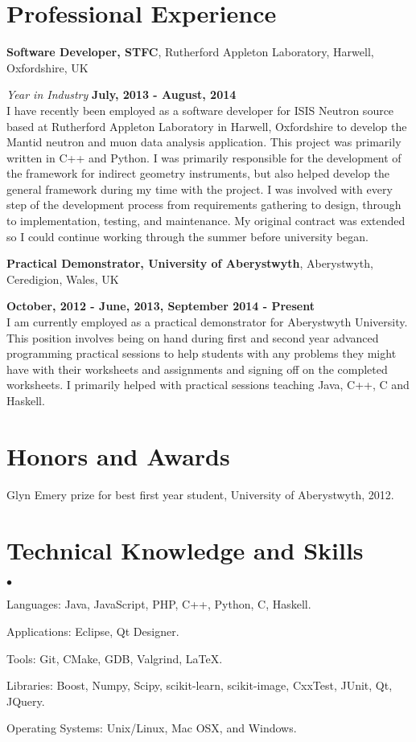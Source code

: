 \documentclass[margin,line]{res}
\newenvironment{list2}{
  \begin{list}{$\bullet$}{%
      \setlength{\itemsep}{0in}
      \setlength{\parsep}{0in} \setlength{\parskip}{0in}
      \setlength{\topsep}{0in} \setlength{\partopsep}{0in}
      \setlength{\leftmargin}{0.2in}}}{\end{list}}
\begin{document}
\begin{resume}
\section{\sc Professional Experience}
{\bf Software Developer, STFC}, Rutherford Appleton Laboratory, Harwell, Oxfordshire, UK

\vspace{-.3cm}
{\em Year in Industry} \hfill {\bf July, 2013 - August, 2014}\\
I have recently been employed as a software developer for ISIS Neutron source based at Rutherford Appleton Laboratory in Harwell, Oxfordshire to develop the Mantid neutron and muon data analysis application. This project was primarily written in C++ and Python. I was primarily responsible for the development of the framework for indirect geometry instruments, but also helped develop the general framework during my time with the project. I was involved with every step of the development process from requirements gathering to design, through to implementation, testing, and maintenance. My original contract was extended so I could continue working through the summer before university began.

{\bf Practical Demonstrator, University of Aberystwyth}, Aberystwyth, Ceredigion, Wales, UK

\vspace{-.3cm}
\hfill {\bf  October, 2012 - June, 2013, September 2014 - Present}\\
I am currently employed as a practical demonstrator for Aberystwyth University. This position involves being on hand during first and second year advanced programming practical sessions to help students with any problems they might have with their worksheets and assignments and signing off on the completed worksheets. I primarily helped with practical sessions teaching Java, C++, C and Haskell.

\section{\sc Honors and Awards}
Glyn Emery prize for best first year student, University of Aberystwyth, 2012.

\section{\sc Technical Knowledge and  Skills}
\begin{list2}
\item Languages: Java, JavaScript, PHP, C++, Python, C, Haskell.
\item Applications: Eclipse, Qt Designer.
\item Tools: Git, CMake, GDB, Valgrind, \LaTeX.
\item Libraries: Boost, Numpy, Scipy, scikit-learn, scikit-image, CxxTest, JUnit, Qt, JQuery.
\item Operating Systems:  Unix/Linux, Mac OSX, and Windows.\\
\end{list2}


\end{resume}
\end{document}
